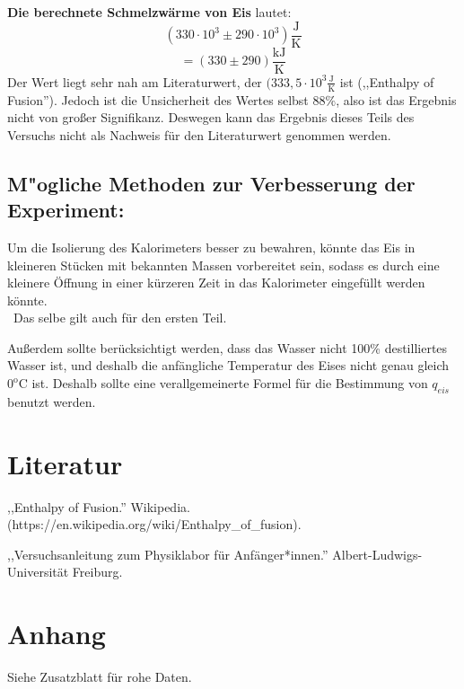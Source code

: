 \documentclass[11pt,a4paper]{article} %
\begin{document}
\textbf{Die berechnete Schmelzw\"arme von Eis} lautet:
$$(330\cdot10^{3} \pm 290\cdot10^{3}) \mathrm{\frac{J}{K}}$$
$$=(330 \pm 290) \mathrm{\frac{kJ}{K}}$$
Der Wert liegt sehr nah am  Literaturwert, der $(333,5\cdot10^{3}\mathrm{\frac{J}{K}}$ ist (,,Enthalpy of Fusion'').
Jedoch ist die Unsicherheit des Wertes selbst $88\%$, also ist das Ergebnis nicht von gro{\ss}er Signifikanz. Deswegen kann das Ergebnis dieses Teils des Versuchs nicht als Nachweis für den Literaturwert genommen werden.

\subsection{M"ogliche Methoden zur Verbesserung der Experiment: }

Um die Isolierung des Kalorimeters besser zu bewahren, könnte das Eis in kleineren Stücken mit bekannten Massen vorbereitet sein, sodass es durch eine kleinere Öffnung in einer kürzeren Zeit in das Kalorimeter eingef\"ullt werden könnte.
\\\
Das selbe gilt auch f\"ur den ersten Teil.

Außerdem sollte berücksichtigt werden, dass das Wasser nicht 100\% destilliertes Wasser ist, und deshalb die anf\"angliche Temperatur des Eises nicht genau gleich $0^{\mathrm{o}}$C ist. Deshalb sollte eine verallgemeinerte Formel f\"ur die Bestimmung von $q_{eis}$ benutzt werden.




\section{Literatur}
,,Enthalpy of Fusion.'' Wikipedia. (https://en.wikipedia.org/wiki/Enthalpy\_of\_fusion).

,,Versuchsanleitung zum Physiklabor für Anfänger*innen.'' Albert-Ludwigs-Universität Freiburg. 
\section{Anhang}
Siehe Zusatzblatt für rohe Daten.
\end{document}
